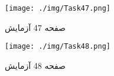 
\begin{figure}[htpb]
\centering
\texttt{[image: ./img/Task47.png]}
\caption{ صفحه 47 آزمایش }
\label{fig:Task47}
\end{figure}
 
 
\begin{figure}[htpb]
\centering
\texttt{[image: ./img/Task48.png]}
\caption{ صفحه 48 آزمایش }
\label{fig:Task48}
\end{figure}
 
 
 
 
 
 
 
 
 
 
 
 
 
